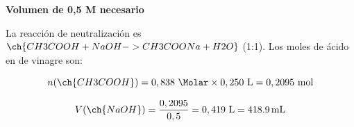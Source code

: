 \begin{exercise}
\begin{solu}
        \textbf{Volumen de  0,5 M necesario}

        La reacción de neutralización es \(\ch{CH3COOH + NaOH -> CH3COONa + H2O}\) (1:1). Los moles de ácido en  de vinagre son:

        \begin{equation*}
            n(\ch{CH3COOH}) = 0,838 \ \si{\Molar} \times 0,250 \ \si{\litre} = 0,2095 \ \text{mol}
        \end{equation*}

        \begin{equation*}
            V(\ch{NaOH}) = \dfrac{0,2095}{0,5} = 0,419 \ \si{\litre} = \SI{418.9}{\milli\litre}
        \end{equation*}

    \end{solu}
\end{exercise}

